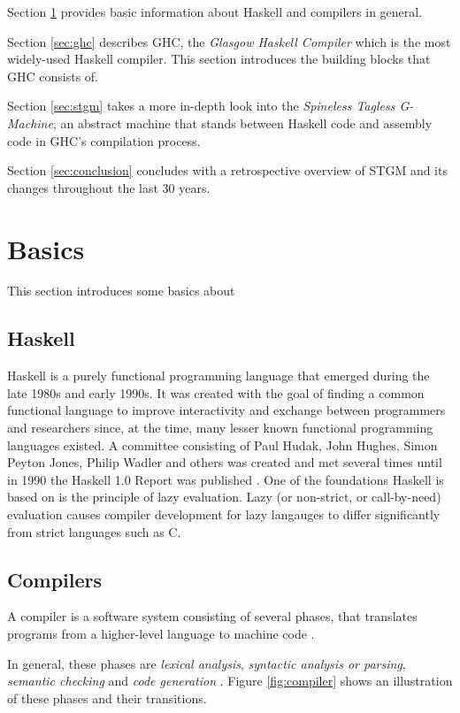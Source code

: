 \documentclass[runningheads]{llncs}
\begin{document}
Section \ref{sec:basics} provides basic information about Haskell and compilers in general.

Section \ref{sec:ghc} describes GHC, the \textit{Glasgow Haskell Compiler} which is the most widely-used Haskell compiler. This section introduces the building blocks that GHC consists of.

Section \ref{sec:stgm} takes a more in-depth look into the \textit{Spineless Tagless G-Machine}, an abstract machine that stands between Haskell code and assembly code in GHC's compilation process.

Section \ref{sec:conclusion} concludes with a retrospective overview of STGM and its changes throughout the last 30 years.


\newpage
\section{Basics}
\label{sec:basics}

This section introduces some basics about

\subsection{Haskell}
Haskell is a purely functional programming language that emerged during the late 1980s and early 1990s. It was created with the goal of finding a common functional language to improve interactivity and exchange between programmers and researchers since, at the time, many lesser known functional programming languages existed. A committee consisting of Paul Hudak, John Hughes, Simon Peyton Jones, Philip Wadler and others was created and met several times until in 1990 the Haskell 1.0 Report was published \cite{hudak2007history}. One of the foundations Haskell is based on is the principle of lazy evaluation. Lazy (or non-strict, or call-by-need) evaluation causes compiler development for lazy langauges to differ significantly from strict languages such as C.

\subsection{Compilers}
A compiler is a software system consisting of several phases, that translates programs from a higher-level language to machine code \cite{muchnick1997advanced}.

In general, these phases are \textit{lexical analysis}, \textit{syntactic analysis or parsing}, \textit{semantic checking} and \textit{code generation} \cite{muchnick1997advanced}. Figure \ref{fig:compiler} shows an illustration of these phases and their transitions.
\end{document}
